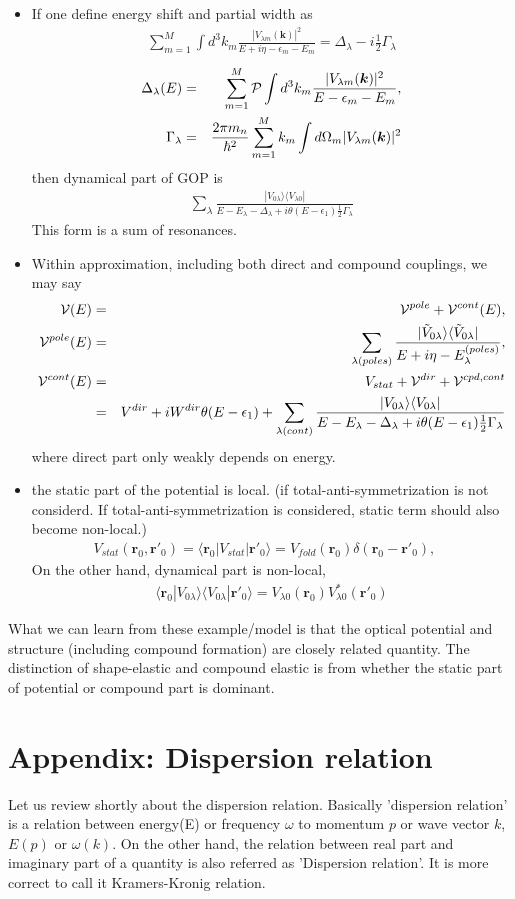 \documentclass[11pt]{book}
\def\bm{\boldsymbol}
\def\vk{{\bm k}}
\def\vr{{\bm r}}
\def\la{\langle}
\def\ra{\rangle}
\newcommand{\bea}{\begin{eqnarray}}
\newcommand{\eea}{\end{eqnarray}}
\newcommand{\no}{\nonumber \\}
\begin{document}
\begin{itemize}
\item If one define energy shift and partial width as
     \bea 
     \sum_{m=1}^M\int d^3 k_m \frac{|V_{\lambda m}(\vk)|^2}{E+i\eta-\epsilon_m-E_m }
     =\Delta_\lambda-i\frac{1}{2}\Gamma_\lambda 
     \eea       
     \bea 
     \Delta_\lambda(E) &=& \sum_{m=1}^M{\cal P}\int d^3 k_m \frac{|V_{\lambda m}(\vk)|^2}{E-\epsilon_m-E_m },\no 
     \Gamma_\lambda &=& \frac{2\pi m_n}{\hbar^2}\sum_{m=1}^M k_m\int d\Omega_m |V_{\lambda m}(\vk)|^2
     \eea  
     then dynamical part of GOP is 
     \bea 
     \sum_\lambda \frac{|V_{0\lambda}\ra\la V_{\lambda 0}|   }
      {E-E_\lambda-\Delta_\lambda+i\theta(E-\epsilon_1)\frac{1}{2}\Gamma_\lambda}
     \eea 
     This form is a sum of resonances. 
 \item Within approximation, including both direct and compound couplings, we may say
     \bea 
     {\cal V}(E)&=&{\cal V}^{pole}+{\cal V}^{cont}(E),\no 
     {\cal V}^{pole}(E)&=& \sum_{\lambda(poles)}\frac{|\tilde{V}_{0\lambda}\ra \la \tilde{V}_{0\lambda}|}
                            {E+i\eta-E_\lambda^{(poles)}},\no     
     {\cal V}^{cont}(E)&=& V_{stat}+{\cal V}^{dir}+{\cal V}^{cpd,cont} \no 
        &=& V^{dir}+i W^{dir} \theta(E-\epsilon_1)
             +\sum_{\lambda(cont)} \frac{|V_{0\lambda}\ra\la V_{0\lambda}|}{E-E_\lambda-\Delta_\lambda+i\theta(E-\epsilon_1)\frac{1}{2}\Gamma_\lambda}     
     \eea 
      where direct part only weakly depends on energy.    
  \item the static part of the potential is local. (if total-anti-symmetrization is not considerd.
     If total-anti-symmetrization is considered, static term should also become non-local.)
    \bea 
    V_{stat}(\vr_0,\vr'_0)=\la \vr_0|V_{stat}|\vr'_0\ra 
              = V_{fold}(\vr_0)\delta(\vr_0-\vr'_0),\quad 
    \eea 
    On the other hand, dynamical part is non-local,
    \bea 
    \la \vr_0|V_{0\lambda}\ra\la V_{0\lambda}|\vr'_0\ra 
    =V_{\lambda 0}(\vr_0)V_{\lambda 0}^* (\vr'_0)
    \eea      
\end{itemize}

What we can learn from these example/model is that 
the optical potential and structure (including compound formation) are closely related quantity. 
The distinction of shape-elastic and compound elastic is from whether the static part of 
potential or compound part is dominant. 

\section{Appendix: Dispersion relation}
Let us review shortly about the dispersion relation. 
Basically 'dispersion relation' is a relation between energy(E) or frequency $\omega$
to momentum $p$ or wave vector $k$, $E(p)$ or $\omega(k)$. 
On the other hand, the relation between real part and imaginary part of 
a quantity is also referred as 'Dispersion relation'. It is more correct to call
it Kramers-Kronig relation. 
\end{document}
